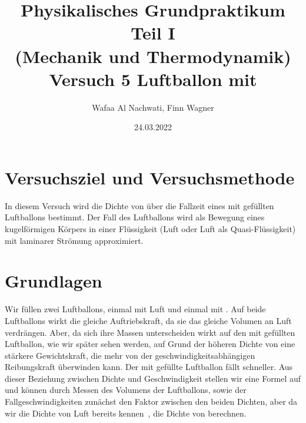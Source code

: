 \documentclass{article}
\date{24.03.2022}
\title{Physikalisches Grundpraktikum Teil I \\ (Mechanik und Thermodynamik) \\ Versuch 5 Luftballon mit \ce{CO2}}
\author{Wafaa Al Nachwati, Finn Wagner}
\begin{document}
    \maketitle

    \section{Versuchsziel und Versuchsmethode}
    In diesem Versuch wird die Dichte von  über die Fallzeit eines mit  gefüllten Luftballons bestimmt.
    Der Fall des Luftballons wird als Bewegung eines kugelförmigen Körpers in einer Flüssigkeit (Luft oder Luft als Quasi-Flüssigkeit) mit laminarer Strömung approximiert.

    \section{Grundlagen}
    Wir füllen zwei Luftballons, einmal mit Luft und einmal mit . Auf beide Luftballons wirkt die gleiche Auftriebskraft, da sie das gleiche Volumen an Luft verdrängen.
    Aber, da sich ihre Massen unterscheiden wirkt auf den mit  gefüllten Luftballon, wie wir später sehen werden, auf Grund der höheren Dichte von 
    eine stärkere Gewichtskraft, die mehr von der geschwindigkeitsabhängigen Reibungskraft überwinden kann. Der mit  gefüllte Luftballon fällt schneller.
    Aus dieser Beziehung zwischen Dichte und Geschwindigkeit stellen wir eine Formel auf und können durch Messen des Volumens der Luftballons, sowie der Fallgeschwindigkeiten
    zunächst den Faktor zwischen den beiden Dichten, aber da wir die Dichte von Luft bereits kennen~\cite{Aufgabenstellung}, die Dichte von  berechnen.
\end{document}
